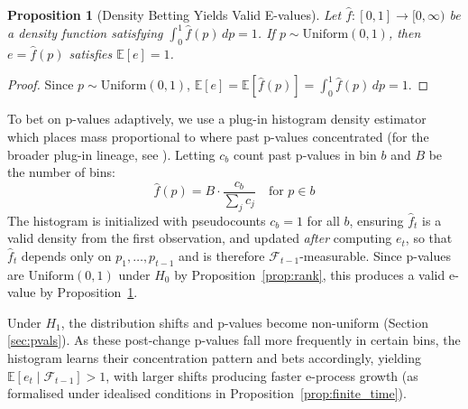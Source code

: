 \documentclass[ejsv2, noshowframe]{imsart}
\theoremstyle{plain}
\newtheorem{proposition}{Proposition}
\theoremstyle{definition}
\theoremstyle{remark}
\newcommand{\E}{\mathbb{E}}
\newcommand{\Unif}{\mathrm{Uniform}}
\begin{document}
\begin{proposition}[Density Betting Yields Valid E-values]
\label{prop:density}
Let $\hat{f}: [0,1] \to [0,\infty)$ be a density function satisfying $\int_0^1 \hat{f}(p)\,dp = 1$. If $p \sim \Unif(0,1)$, then $e = \hat{f}(p)$ satisfies $\E[e] = 1$.
\end{proposition}
\begin{proof}
Since $p \sim \Unif(0,1)$, $\E[e] = \E[\hat{f}(p)] = \int_0^1 \hat{f}(p)\,dp = 1$.
\end{proof}

\noindent To bet on p-values adaptively, we use a plug-in histogram density estimator which places mass proportional to where past p-values concentrated (for the broader plug-in lineage, see \citet{fedorova2012plugin}). Letting $c_b$ count past p-values in bin $b$ and $B$ be the number of bins:
\begin{equation}
 \hat{f}(p) = B \cdot \frac{c_b}{\sum_j c_j} \quad \text{for } p \in b
\end{equation}
The histogram is initialized with pseudocounts $c_b = 1$ for all $b$, ensuring $\hat{f}_t$ is a valid density from the first observation, and updated \emph{after} computing $e_t$, so that $\hat{f}_t$ depends only on $p_1, \ldots, p_{t-1}$ and is therefore $\mathcal{F}_{t-1}$-measurable. Since p-values are $\Unif(0,1)$ under $H_0$ by Proposition~\ref{prop:rank}, this produces a valid e-value by Proposition~\ref{prop:density}.

Under $H_1$, the distribution shifts and p-values become non-uniform (Section \ref{sec:pvals}). As these post-change p-values fall more frequently in certain bins, the histogram learns their concentration pattern and bets accordingly, yielding $\E[e_t \mid \mathcal{F}_{t-1}] > 1$, with larger shifts producing faster e-process growth (as formalised under idealised conditions in Proposition~\ref{prop:finite_time}).
\end{document}
